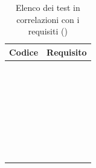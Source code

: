 	\setcounter{tableCounter}{1}
	\begin{table}[H]
		\centering
		{\def\arraystretch{1.4}
		\begin{tabularx}{\textwidth}{YY}
			\textbf{Codice} & \textbf{Requisito} \\
			\toprule
			\addtots & \\
			\addtots & \\
			\addtots & \\
			\addtots & \\
			\addtots & \\
			\addtots & \\
			\addtots &  \\
			\addtots & \\
			\addtots &  \\
			\addtots &  \\
			\addtots & \\
			\addtots & \\
			\addtots &  \\
			\addtots &  \\
			\addtots &  \\
			\addtots &  \\
			\addtots &  \\
			\addtots & \\
			\addtots &  \\
			\addtots &  \\
			\addtots &  \\
			\addtots &  \\
			\addtots &  \\
			\addtots &  \\
			\addtots &  \\
			\addtots &  \\
			\addtots &  \\
			\addtots &  \\
			\addtots &  \\
			\addtots &  \\
			\addtots &  \\
            \bottomrule\\
			\end{tabularx}}
		\caption{Elenco dei test in correlazioni con i requisiti (\thetableCounter)}
	\end{table}

